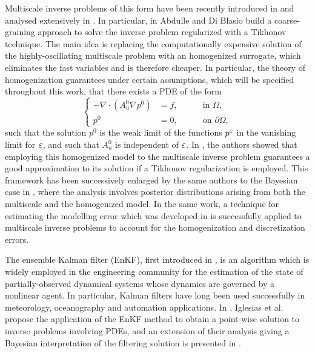 Multiscale inverse problems of this form have been recently introduced in \cite{NPS12} and analysed extensively in \cite{AbD18, AbD19}. In particular, in \cite{AbD19} Abdulle and Di Blasio build a coarse-graining approach to solve the inverse problem regularized with a Tikhonov technique. The main idea is replacing the computationally expensive solution of the highly-oscillating multiscale problem with an homogenized surrogate, which eliminates the fast variables and is therefore cheaper. In particular, the theory of homogenization guarantees under certain assumptions, which will be specified throughout this work, that there exists a PDE of the form
\begin{equation}
\left\{
\begin{alignedat}{2}
- \nabla \cdot ( A^0_u \nabla p^0 ) &= f, \quad && \text{ in } \Omega, \\
p^0 &= 0, \quad && \text{ on } \partial \Omega,
\end{alignedat}
\right.
\end{equation}
such that the solution $p^0$ is the weak limit of the functions $p^\varepsilon$ in the vanishing limit for $\varepsilon$, and such that $A_u^0$ is independent of $\varepsilon$. In \cite{AbD17}, the authors showed that employing this homogenized model to the multiscale inverse problem guarantees a good approximation to its solution if a Tikhonov regularization is employed. This framework has been successively enlarged by the same authors to the Bayesian case in \cite{AbD17}, where the analysis involves posterior distributions arising from both the multiscale and the homogenized model. In the same work, a technique for estimating the modelling error which was developed in \cite{CES14, CDS18} is successfully applied to multiscale inverse problems to account for the homogenization and discretization errors.

The ensemble Kalman filter (EnKF), first introduced in \cite{Eve94}, is an algorithm which is widely employed in the engineering community for the estimation of the state of partially-observed dynamical systems whose dynamics are governed by a nonlinear agent. In particular, Kalman filters have long been used successfully in meteorology, oceanography and automation applications. In \cite{ILS13}, Iglesias et al. propose the application of the EnKF method to obtain a point-wise solution to inverse problems involving PDEs, and an extension of their analysis giving a Bayesian interpretation of the filtering solution is presented in \cite{ScS17}.

